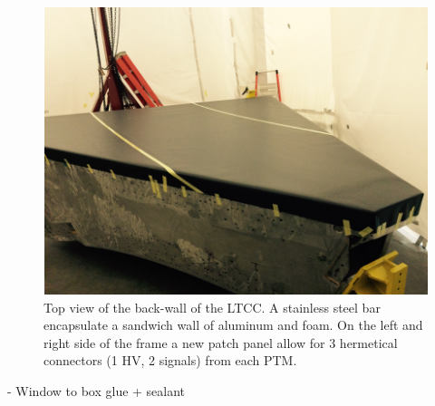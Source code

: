 \begin{figure}[h]
	\centering
	\includegraphics[width=1.0\columnwidth,keepaspectratio]{img/upstreamWindow.png}
	\caption{Top view of the back-wall of the LTCC. A stainless steel bar encapsulate a sandwich wall of aluminum and foam. On the left and right side
				 of the frame a new patch panel allow for 3 hermetical connectors (1 HV, 2 signals) from each PTM. }
	\label{fig:upstreamWindow.png}
\end{figure}




- Window to box glue + sealant

